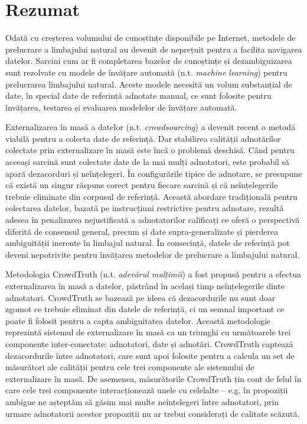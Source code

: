 \manualmark
{}

\chapter*{Rezumat}

Odată cu creșterea volumului de cunoștințe disponibile pe Internet, metodele de prelucrare a limbajului natural au devenit de neprețuit pentru a facilita navigarea datelor. Sarcini cum ar fi completarea bazelor de cunoștințe și dezambiguizarea sunt rezolvate cu modele de învățare automată (n.t. \textit{machine learning}) pentru prelucrarea limbajului natural. Aceste modele necesită un volum substanțial de date, în special date de referință adnotate manual, ce sunt folosite pentru învățarea, testarea și evaluarea modelelor de învățare automată.

Externalizarea în masă a datelor (n.t. \textit{crowdsourcing}) a devenit recent o metodă viabilă pentru a colecta date de referință. Dar stabilirea calității adnotărilor colectate prin externalizare în masă este încă o problemă deschisă. Când pentru aceeași sarcină sunt colectate date de la mai mulți adnotatori, este probabil să apară dezacorduri și neînțelegeri. În configurările tipice de adnotare, se presupune că există un singur răspuns corect pentru fiecare sarcină și că neînțelegerile trebuie eliminate din corpusul de referință. Această abordare tradițională pentru colectarea datelor, bazată pe instrucțiuni restrictive pentru adnotare, rezultă adesea în penalizarea nejustificată a adnotatorilor calificați ce oferă o perspectivă diferită de consensul general, precum și date supra-generalizate și pierderea ambiguității inerente în limbajul natural. În consecință, datele de referință pot deveni nepotrivite pentru învățarea metodelor de prelucrare a limbajului natural.

Metodologia CrowdTruth (n.t. \textit{adevărul mulțimii}) a fost propusă pentru a efectua externalizarea în masă a datelor, păstrând în același timp neînțelegerile dinte adnotatori. CrowdTruth se bazează pe ideea că dezacordurile nu sunt doar zgomot ce trebuie eliminat din datele de referință, ci un semnal important ce poate fi folosit pentru a capta ambiguitatea datelor. Această metodologie reprezintă sistemul de externalizare în masă ca un triunghi cu următoarele trei componente inter-conectate: adnotatori, date și adnotări. CrowdTruth captează dezacordurile între adnotatori, care sunt apoi folosite pentru a calcula un set de măsurători ale calității pentru cele trei componente ale sistemului de externalizare în masă. De asemenea, măsurătorile CrowdTruth țin cont de felul în care cele trei componente interacționează unele cu celelalte -- e.g. în propoziții ambigue ne așteptăm să găsim mai multe neînțelegeri între adnotatori, prin urmare adnotatorii acestor propoziții nu ar trebui considerați de calitate scăzută.

